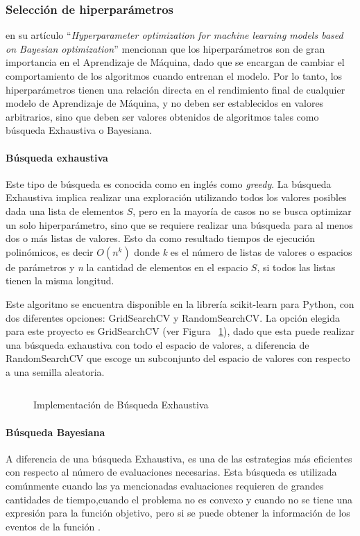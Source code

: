 \subsubsection{Selección de hiperparámetros}
\textcite{Wu2019} en su artículo \enquote{\textit{Hyperparameter optimization for machine learning models based on Bayesian optimization}} mencionan que los hiperparámetros son de gran importancia en el Aprendizaje de Máquina, dado que se encargan de cambiar el comportamiento de los algoritmos cuando entrenan el modelo. Por lo tanto, los hiperparámetros tienen una relación directa en el rendimiento final de cualquier modelo de Aprendizaje de Máquina, y no deben ser establecidos en valores arbitrarios, sino que deben ser valores obtenidos de algoritmos tales como búsqueda Exhaustiva o Bayesiana.

\paragraph{Búsqueda exhaustiva} Este tipo de búsqueda es conocida como en inglés como \textit{greedy}. La búsqueda Exhaustiva implica realizar una exploración utilizando todos los valores posibles dada una lista de elementos $S$, pero en la mayoría de casos no se busca optimizar un solo hiperparámetro, sino que se requiere realizar una búsqueda para al menos dos o más listas de valores. Esto da como resultado tiempos de ejecución polinómicos, es decir $O(n^k)$ donde \textit{k} es el número de listas de valores o espacios de parámetros y \textit{n} la cantidad de elementos en el espacio $S$, si todos las listas tienen la misma longitud.

Este algoritmo se encuentra disponible en la librería scikit-learn \parencite{sklearn_api} para Python, con dos diferentes opciones: GridSearchCV y RandomSearchCV. La opción elegida para este proyecto es GridSearchCV (ver Figura ~\ref{fig:impbusexh}), dado que esta puede realizar una búsqueda exhaustiva con todo el espacio de valores, a diferencia de RandomSearchCV que escoge un subconjunto del espacio de valores con respecto a una semilla aleatoria.

\begin{figure}[H]
    \centering
    \caption{Implementación de Búsqueda Exhaustiva}
    \inputminted{Python}{pycode/gridsearch.py}
    \label{fig:impbusexh}
\end{figure}

\paragraph{Búsqueda Bayesiana} A diferencia de una búsqueda Exhaustiva, es una de las estrategias más eficientes con respecto al número de evaluaciones necesarias. Esta búsqueda es utilizada comúnmente cuando las ya mencionadas evaluaciones requieren de grandes cantidades de tiempo,cuando el problema no es convexo y cuando no se tiene una expresión para la función objetivo, pero si se puede obtener la información de los eventos de la función \parencite{Brochu2010}.

